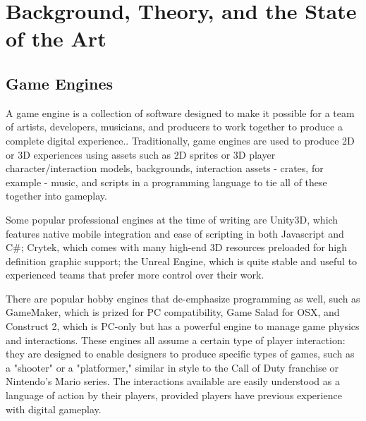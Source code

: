\chapter{Background, Theory, and the State of the Art}\thispagestyle{empty} %

\label{Chapter2} %


\section{Game Engines}
A game engine is a collection of software designed to make it possible for a team of artists, developers, musicians, and producers to work together to produce a complete digital experience.. Traditionally, game engines are used to produce 2D or 3D experiences using assets such as 2D sprites or 3D player character/interaction models, backgrounds, interaction assets - crates, for example - music, and scripts in a programming language to tie all of these together into gameplay. 

Some popular professional engines at the time of writing are Unity3D, which features native mobile integration and ease of scripting in both Javascript and C#; Crytek, which comes with many high-end 3D resources preloaded for high definition graphic support; the Unreal Engine, which is quite stable and useful to experienced teams that prefer more control over their work.

There are popular hobby engines that de-emphasize programming as well, such as GameMaker, which is prized for PC compatibility, Game Salad for OSX, and Construct 2, which is PC-only but has a powerful engine to manage game physics and interactions. These engines all assume a certain type of player interaction: they are designed to enable designers to produce specific types of games, such as a "shooter" or a "platformer," similar in style to the Call of Duty franchise or Nintendo's Mario series. The interactions available are easily understood as a language of action by their players, provided players have previous experience with digital gameplay.

